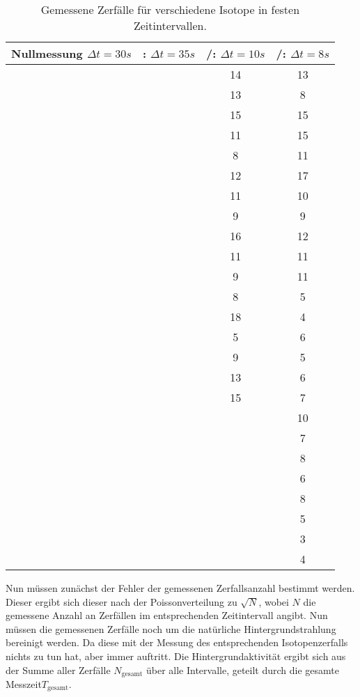 \begin{table}[H]
  \centering
  \caption{Gemessene Zerfälle für verschiedene Isotope in festen Zeitintervallen.}
  \label{tab:Mess2}
  \begin{tabular}{S[table-format=2] S[table-format=3] S[table-format=3] S[table-format=3]}
      \toprule
      {Nullmessung $\Delta t=30s$ }&{: $\Delta t=35s$}&{/: $\Delta t=10s$}&{/: $\Delta t=8s$}\\
      \midrule
      &  & 14 & 13 \\
      &  & 13 & 8 \\
      &  & 15 & 15 \\
      &  & 11 & 15 \\
      &  & 8 & 11 \\
      &  & 12 & 17 \\
      &  & 11 & 10 \\
      &  & 9 & 9 \\
      &  & 16 & 12 \\
      &  & 11 & 11 \\
      &  & 9 & 11 \\
      &  & 8 & 5 \\
      &  & 18 & 4 \\
      &  & 5 & 6 \\
      &  & 9 & 5 \\
      &  & 13 & 6 \\
      &  & 15 & 7 \\
      &  &  & 10 \\
      &  &  & 7 \\
      &  &  & 8 \\
      &  &  & 6 \\
      &  &  & 8 \\
      &  &  & 5 \\
      &  &  & 3 \\
      &  &  & 4 \\       
      \bottomrule
  \end{tabular}
\end{table}
\noindent Nun müssen zunächst der Fehler der gemessenen Zerfallsanzahl bestimmt werden. Dieser ergibt sich dieser nach der 
Poissonverteilung zu $\sqrt{N}$, wobei $N$ die gemessene Anzahl an Zerfällen im entsprechenden Zeitintervall angibt.
Nun müssen die gemessenen Zerfälle noch um die natürliche Hintergrundstrahlung bereinigt werden. Da diese mit der Messung des entsprechenden Isotopenzerfalls
nichts zu tun hat, aber immer auftritt. Die Hintergrundaktivität ergibt sich aus der Summe aller Zerfälle $N_\text{gesamt}$ über alle Intervalle, geteilt durch die gesamte Messzeit$T_\text{gesamt}$.
